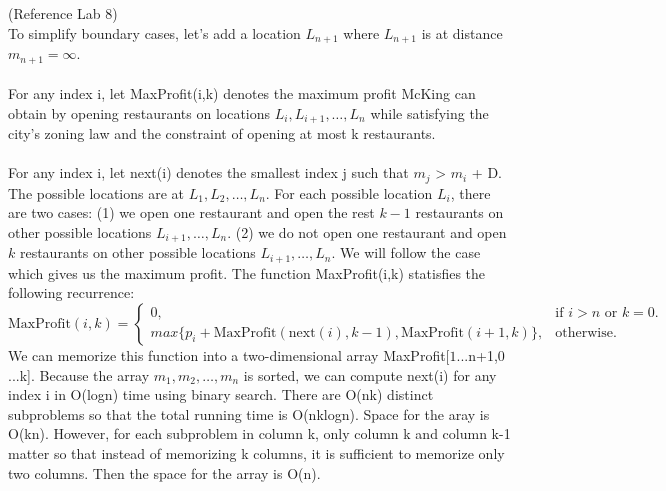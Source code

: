 \documentclass[11pt]{article}
\begin{document}
\begin{solution} (Reference Lab 8) \\
To simplify boundary cases, let's add a location $L_{n+1}$ where $L_{n+1}$ is at distance $m_{n+1} = \infty$. \\\\
For any index i, let MaxProfit(i,k) denotes the maximum profit McKing can obtain by opening restaurants on locations $L_i,L_{i+1}, \ldots, L_n$ while satisfying the city's zoning law and the constraint of opening at most k restaurants. \\\\
For any index i, let next(i) denotes the smallest index j such that $m_j$ > $m_i$ + D. The possible locations are at $L_1,L_2, \ldots, L_n$. For each possible location $L_i$, there are two cases: (1) we open one restaurant and open the rest $k-1$ restaurants on other possible locations $L_{i+1}, \ldots, L_n$. (2) we do not open one restaurant and open $k$ restaurants on other possible locations $L_{i+1}, \ldots, L_n$. We will follow the case which gives us the maximum profit. The function MaxProfit(i,k) statisfies the following recurrence: \\
\begin{equation}
  \text{MaxProfit}(i,k)=\begin{cases}
    0, & \text{if $i>n$ or $k=0$}.\\
    max\{p_i+\text{MaxProfit}(\text{next}(i),k-1),\text{MaxProfit}(i+1,k)\}, & \text{otherwise}.
  \end{cases}
\end{equation}
We can memorize this function into a two-dimensional array MaxProfit[$1$...n+1,$0$...k]. Because the array $m_1, m_2, \ldots, m_n$ is sorted, we can compute next(i) for any index i in O(logn) time using binary search. There are O(nk) distinct subproblems so that the total running time is O(nklogn). Space for the aray is O(kn). However, for each subproblem in column k, only column k and column k-1 matter so that instead of memorizing k columns, it is sufficient to memorize only two columns. Then the space for the array is O(n).
  



\end{solution}
\end{document}
